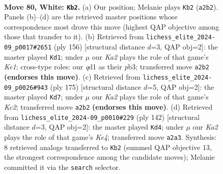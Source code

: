 \documentclass[11pt]{article}
\begin{document}
\clearpage

\begin{figure}[p]\centering
\begin{subfigure}{0.46\textwidth}\centering
\resizebox{\linewidth}{!}{%
\newchessgame
\chessboard[
  setfen={8/8/1p5k/p7/2P5/8/K7/3q4 w - - 16 80},
  showmover=false,
  pgfstyle=straightmove, color=movearrow, markmove={a2-b2}
]}
\caption{}
\end{subfigure}\hfill
\begin{subfigure}{0.46\textwidth}\centering
\resizebox{\linewidth}{!}{%
\newchessgame
\chessboard[
  setfen={8/8/8/3k2p1/5pP1/1p6/8/4K3 w - - 0 79},
  showmover=false,
  pgfstyle=straightmove, color=movearrow, markmove={e1-d1}
]}
\caption{}
\end{subfigure}
\\[4pt]
\begin{subfigure}{0.46\textwidth}\centering
\resizebox{\linewidth}{!}{%
\newchessgame
\chessboard[
  setfen={8/2k5/p7/P2K4/1P6/8/8/8 b - - 14 88},
  showmover=false,
  pgfstyle=straightmove, color=movearrow, markmove={c7-d7}
]}
\caption{}
\end{subfigure}\hfill
\begin{subfigure}{0.46\textwidth}\centering
\resizebox{\linewidth}{!}{%
\newchessgame
\chessboard[
  setfen={8/8/p4k2/Pp6/4K3/8/8/8 w - - 0 72},
  showmover=false,
  pgfstyle=straightmove, color=movearrow, markmove={e4-d4}
]}
\caption{}
\end{subfigure}
\caption{\textbf{Move 80, White: \texttt{Kb2}.} (a) Our position; Melanie plays \texttt{Kb2} (\texttt{a2b2}). Panels (b)--(d) are the retrieved master positions whose correspondence most drove this move (highest QAP objective among those that transfer to it). (b) Retrieved from \texttt{lichess\_elite\_2024-09\_p0017\#2651} (ply 156) [structural distance $d$=3, QAP obj=2]: the master played \texttt{Kd1}; under $\mu$ our \emph{Ka2} plays the role of that game's \emph{Ke1}; cross-type roles: our \emph{q}d1 as their \emph{p}b3; transferred move \texttt{a2b2} \textbf{(endorses this move)}. (c) Retrieved from \texttt{lichess\_elite\_2024-09\_p0026\#943} (ply 175) [structural distance $d$=5, QAP obj=2]: the master played \texttt{Kd7}; under $\mu$ our \emph{Ka2} plays the role of that game's \emph{Kc2}; transferred move \texttt{a2b2} \textbf{(endorses this move)}. (d) Retrieved from \texttt{lichess\_elite\_2024-09\_p0010\#229} (ply 142) [structural distance $d$=3, QAP obj=2]: the master played \texttt{Kd4}; under $\mu$ our \emph{Ka2} plays the role of that game's \emph{Ke4}; transferred move \texttt{a2a3}. Synthesis: 8 retrieved analogs transferred to \texttt{Kb2} (summed QAP objective 13, the strongest correspondence among the candidate moves); Melanie committed it via the \texttt{search} selector.}
\label{fig:thought-m158}
\end{figure}
\end{document}
